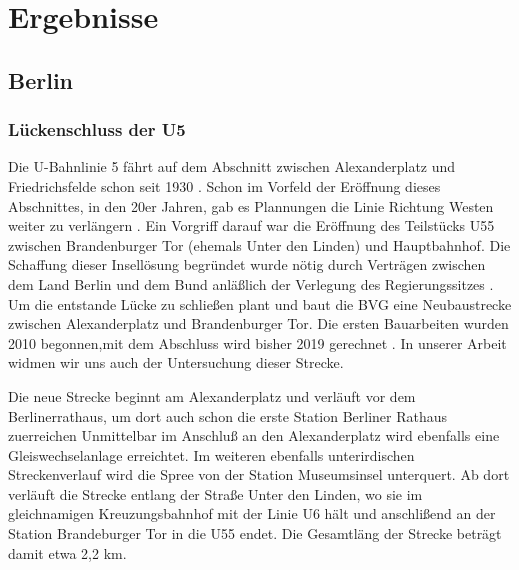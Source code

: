 \section{Ergebnisse}

\begin{comment}

Gliederung meiner Streckenbeschreibung (Yves)

* Übersicht
  * Umfeld des Bauprojekts
  * von wo nach wo
  * historische Einordnung

* konkrter Streckenverlauf
  * detalierte Daten (weichen etc ..)


* Probleme
  * bautechnisch
  * gesellschaftlich

* Zeitplan

* Kosten
\end{comment}



\subsection{Berlin}
\subsubsection*{Lückenschluss der U5}

Die U-Bahnlinie 5 fährt auf dem Abschnitt zwischen Alexanderplatz und
Friedrichsfelde schon seit 1930 \cite{bkhU5}. Schon im Vorfeld der
Eröffnung dieses Abschnittes, in den 20er Jahren, gab es Plannungen die Linie
Richtung Westen weiter zu verlängern \cite{bvgWebsiteU5}. Ein Vorgriff darauf
war die Eröffnung des Teilstücks U55 zwischen Brandenburger Tor (ehemals Unter
den Linden) und Hauptbahnhof. Die Schaffung dieser Insellösung begründet wurde
nötig durch Verträgen zwischen dem Land Berlin und dem Bund anläßlich der
Verlegung des Regierungssitzes \cite{hauptstadtvertrag}. Um die entstande Lücke
zu schließen plant und baut die BVG eine Neubaustrecke zwischen Alexanderplatz
und Brandenburger Tor. Die ersten Bauarbeiten wurden 2010 begonnen,mit dem
Abschluss wird bisher 2019 gerechnet \cite{bvgWebsiteU5plan}. In unserer Arbeit
widmen wir uns auch der Untersuchung dieser Strecke.

Die neue Strecke beginnt am Alexanderplatz und verläuft vor dem Berlinerrathaus,
um dort auch schon die erste Station Berliner Rathaus zuerreichen
\cite{bkhU5} \cite{bvgWebsiteU5} Unmittelbar im Anschluß an den
Alexanderplatz wird ebenfalls eine Gleiswechselanlage erreichtet. Im weiteren
ebenfalls unterirdischen Streckenverlauf wird die Spree von der Station
Museumsinsel unterquert. Ab dort verläuft die Strecke entlang der Straße Unter
den Linden, wo sie im gleichnamigen Kreuzungsbahnhof mit der Linie U6 hält und
anschlißend an der Station Brandeburger Tor in die U55 endet. Die Gesamtläng der
Strecke beträgt damit etwa 2,2 km.

